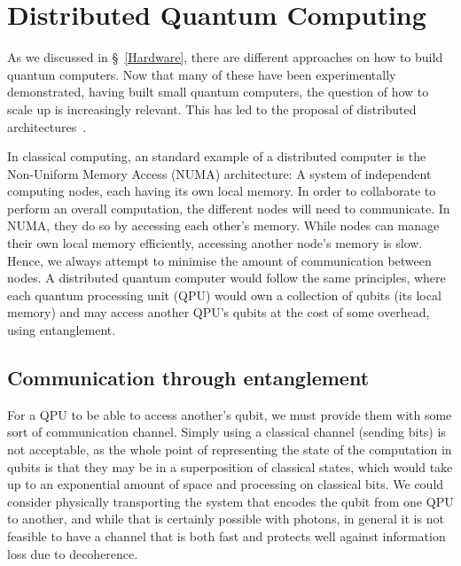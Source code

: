 \chapter{Distributed Quantum Computing}
\label{chap:Distributed}

As we discussed in \S~\ref{Hardware}, there are different approaches on how to build quantum computers. Now that many of these have been experimentally demonstrated, having built small quantum computers, the question of how to scale up is increasingly relevant. This has led to the proposal of distributed architectures~\citep{ArchitectureSurvey}.

In classical computing, an standard example of a distributed computer is the Non-Uniform Memory Access (NUMA) architecture: A system of independent computing nodes, each having its own local memory. In order to collaborate to perform an overall computation, the different nodes will need to communicate. In NUMA, they do so by accessing each other's memory. While nodes can manage their own local memory efficiently, accessing another node's memory is slow. Hence, we always attempt to minimise the amount of communication between nodes. A distributed quantum computer would follow the same principles, where each quantum processing unit (QPU) would own a collection of qubits (its local memory) and may access another QPU's qubits at the cost of some overhead, using entanglement.

\section{Communication through entanglement}
\label{Ebits}

For a QPU to be able to access another's qubit, we must provide them with some sort of communication channel. Simply using a classical channel (sending bits) is not acceptable, as the whole point of representing the state of the computation in qubits is that they may be in a superposition of classical states, which would take up to an exponential amount of space and processing on classical bits. We could consider physically transporting the system that encodes the qubit from one QPU to another, and while that is certainly possible with photons, in general it is not feasible to have a channel that is both fast and protects well against information loss due to decoherence.

